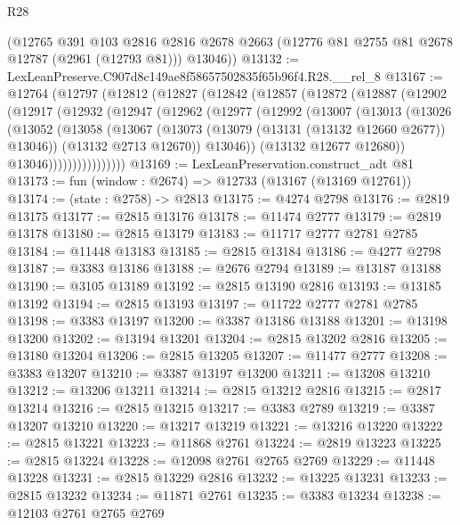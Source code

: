 \begin{lexlean}{R28}
\begin{coremodule}
      (@12765
        @391
        @103
        @2816
        @2816
        @2678
        @2663
        (@12776 @81 @2755 @81 @2678 @12787 (@2961 (@12793 @81)))
        @13046))
@13132 := LexLeanPreserve.C907d8c149ae8f58657502835f65b96f4.R28.__rel_8
@13167 := @12764
    (@12797
      (@12812
        (@12827
          (@12842
            (@12857
              (@12872
                (@12887
                  (@12902
                    (@12917
                      (@12932
                        (@12947
                          (@12962
                            (@12977
                              (@12992
                                (@13007
                                  (@13013
                                    (@13026
                                      (@13052
                                        (@13058
                                          (@13067
                                            (@13073 (@13079 (@13131 (@13132 @12660 @2677)) @13046))
                                            (@13132 @2713 @12670))
                                          @13046))
                                      (@13132 @12677 @12680))
                                    @13046))))))))))))))))
@13169 := LexLeanPreservation.construct_adt @81
@13173 := fun (window : @2674) => @12733 (@13167 (@13169 @12761))
@13174 := (state : @2758) -> @2813
@13175 := @4274 @2798
@13176 := @2819 @13175
@13177 := @2815 @13176
@13178 := @11474 @2777
@13179 := @2819 @13178
@13180 := @2815 @13179
@13183 := @11717 @2777 @2781 @2785
@13184 := @11448 @13183
@13185 := @2815 @13184
@13186 := @4277 @2798
@13187 := @3383 @13186
@13188 := @2676 @2794
@13189 := @13187 @13188
@13190 := @3105 @13189
@13192 := @2815 @13190 @2816
@13193 := @13185 @13192
@13194 := @2815 @13193
@13197 := @11722 @2777 @2781 @2785
@13198 := @3383 @13197
@13200 := @3387 @13186 @13188
@13201 := @13198 @13200
@13202 := @13194 @13201
@13204 := @2815 @13202 @2816
@13205 := @13180 @13204
@13206 := @2815 @13205
@13207 := @11477 @2777
@13208 := @3383 @13207
@13210 := @3387 @13197 @13200
@13211 := @13208 @13210
@13212 := @13206 @13211
@13214 := @2815 @13212 @2816
@13215 := @2817 @13214
@13216 := @2815 @13215
@13217 := @3383 @2789
@13219 := @3387 @13207 @13210
@13220 := @13217 @13219
@13221 := @13216 @13220
@13222 := @2815 @13221
@13223 := @11868 @2761
@13224 := @2819 @13223
@13225 := @2815 @13224
@13228 := @12098 @2761 @2765 @2769
@13229 := @11448 @13228
@13231 := @2815 @13229 @2816
@13232 := @13225 @13231
@13233 := @2815 @13232
@13234 := @11871 @2761
@13235 := @3383 @13234
@13238 := @12103 @2761 @2765 @2769

\end{coremodule}
\end{lexlean}
